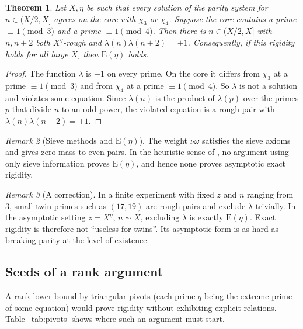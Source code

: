 \documentclass[11pt]{amsart}
\newtheorem{theorem}{Theorem}[section]
\theoremstyle{definition}
\theoremstyle{remark}
\newtheorem{remark}[theorem]{Remark}
\newcommand{\EE}{\mathrm E}
\begin{document}
\begin{theorem}\label{thm:rigidE}
Let $X,\eta$ be such that every solution of the parity system for $n\in(X/2,X]$ agrees on the core with $\chi_3$ or $\chi_4$. Suppose the core contains a prime $\equiv1\pmod3$ and a prime $\equiv1\pmod4$. Then there is $n\in(X/2,X]$ with $n,n+2$ both $X^\eta$-rough and $\lambda(n)\lambda(n+2)=+1$. Consequently, if this rigidity holds for all large $X$, then $\EE(\eta)$ holds.
\end{theorem}
\begin{proof}
The function $\lambda$ is $-1$ on every prime. On the core it differs from $\chi_3$ at a prime $\equiv1\pmod3$ and from $\chi_4$ at a prime $\equiv1\pmod 4$. So $\lambda$ is not a solution and violates some equation. Since $\lambda(n)$ is the product of $\lambda(p)$ over the primes $p$ that divide $n$ to an odd power, the violated equation is a rough pair with $\lambda(n)\lambda(n+2)=+1$.
\end{proof}

\begin{remark}[Sieve methods and $\EE(\eta)$]\label{rem:sieveE}
The weight $\nu\omega$ satisfies the sieve axioms and gives zero mass to even pairs. In the heuristic sense of \cite[\S8]{Polymath8b}, no argument using only sieve information proves $\EE(\eta)$, and hence none proves asymptotic exact rigidity.
\end{remark}

\begin{remark}[A correction]
In a finite experiment with fixed $z$ and $n$ ranging from $3$, small twin primes such as $(17,19)$ are rough pairs and exclude $\lambda$ trivially. In the asymptotic setting $z=X^\eta$, $n\sim X$, excluding $\lambda$ is exactly $\EE(\eta)$. Exact rigidity is therefore not ``useless for twins''. Its asymptotic form is as hard as breaking parity at the level of existence.
\end{remark}

\subsection{Seeds of a rank argument}
A rank lower bound by triangular pivots (each prime $q$ being the extreme prime of some equation) would prove rigidity without exhibiting explicit relations. Table~\ref{tab:pivots} shows where such an argument must start.
\end{document}
